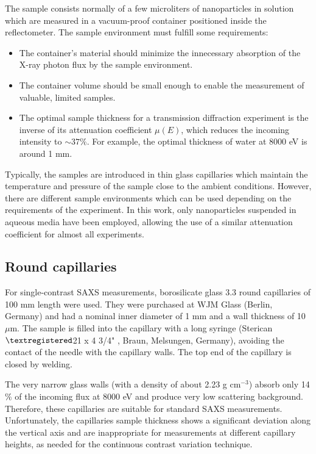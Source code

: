 The sample consists normally of a few microliters of nanoparticles in solution which are measured in a vacuum-proof container positioned inside the reflectometer. The sample environment must fulfill some requirements:

\begin{itemize}
        \item The container's material should minimize the innecessary absorption of the X-ray photon flux by the sample environment.
        \item The container volume should be small enough to enable the measurement of valuable, limited samples.
        \item The optimal sample thickness for a transmission diffraction experiment is the inverse of its attenuation coefficient $\mu(E)$, which reduces the incoming intensity to $\sim37\%$. For example, the optimal thickness of water at 8000 eV is around 1 mm.
\end{itemize}

Typically, the samples are introduced in thin glass capillaries which maintain the temperature and pressure of the sample close to the ambient conditions. However, there are different sample environments which can be used depending on the requirements of the experiment. In this work, only nanoparticles suspended in aqueous media have been employed, allowing the use of a similar attenuation coefficient for almost all experiments.

\subsection{Round capillaries}

For single-contrast SAXS measurements, borosilicate glass 3.3 round capillaries of 100 mm length were used. They were purchased at WJM Glass (Berlin, Germany) and had a nominal inner diameter of 1 mm and a wall thickness of 10 $\mu$m. The sample is filled into the capillary with a long syringe (Sterican$\textregistered$21 x 4 3/4" , Braun, Melsungen, Germany), avoiding the contact of the needle with the capillary walls. The top end of the capillary is closed by welding.

The very narrow glass walls (with a density of about 2.23 g cm$^{-3}$) absorb only 14 $\%$ of the incoming flux at 8000 eV and produce very low scattering background. Therefore, these capillaries are suitable for standard SAXS measurements. Unfortunately, the capillaries sample thickness shows a significant deviation along the vertical axis and are inappropriate for measurements at different capillary heights, as needed for the continuous contrast variation technique.

